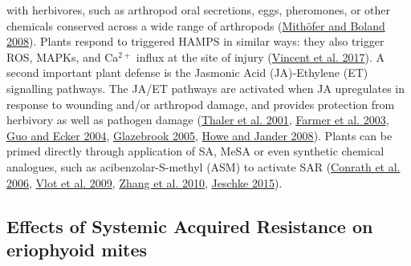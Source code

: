 \documentclass{ufdissertation}[overrideChapters] %
\begin{document}
{with herbivores, such as arthropod oral secretions, eggs, pheromones, or other chemicals conserved across a wide range of arthropods (\protect\hyperlink{ref-Mithoefer2008}{Mithöfer and Boland 2008}). Plants respond to triggered HAMPS in similar ways: they also trigger ROS, MAPKs, and Ca\({^{2+}}\) influx at the site of injury (\protect\hyperlink{ref-Vincent2017}{Vincent et al. 2017}). A second important plant defense is the Jasmonic Acid (JA)-Ethylene (ET) signalling pathways. The JA/ET pathways are activated when JA upregulates in response to wounding and/or arthropod damage, and provides protection from herbivory as well as pathogen damage (\protect\hyperlink{ref-Thaler2001}{Thaler et al. 2001}, \protect\hyperlink{ref-Farmer2003}{Farmer et al. 2003}, \protect\hyperlink{ref-Guo2004}{Guo and Ecker 2004}, \protect\hyperlink{ref-Glazebrook2005}{Glazebrook 2005}, \protect\hyperlink{ref-Howe2008}{Howe and Jander 2008}). Plants can be primed directly through application of SA, MeSA or even synthetic chemical analogues, such as acibenzolar-S-methyl (ASM) to activate SAR (\protect\hyperlink{ref-Conrath2006}{Conrath et al. 2006}, \protect\hyperlink{ref-Vlot2009}{Vlot et al. 2009}, \protect\hyperlink{ref-Zhang2010}{Zhang et al. 2010}, \protect\hyperlink{ref-Jeschke2015}{Jeschke 2015}).

\hypertarget{effects-of-systemic-acquired-resistance-on-eriophyoid-mites}{%
\subsection{Effects of Systemic Acquired Resistance on eriophyoid mites}\label{effects-of-systemic-acquired-resistance-on-eriophyoid-mites}}

}
\end{document}

